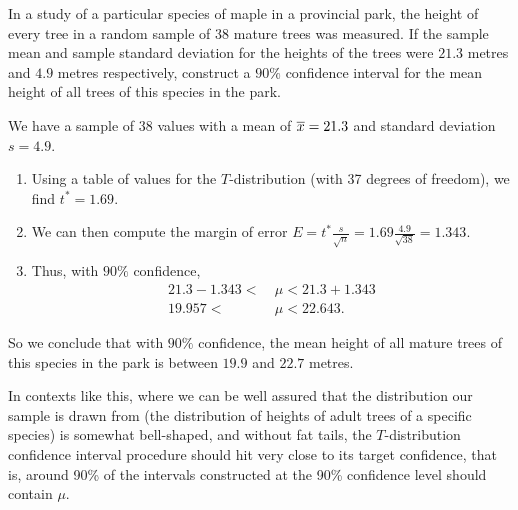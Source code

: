 \begin{example}
In a study of a particular species of maple in a provincial park, the height of every tree in a random sample of 38 mature trees was measured. If the sample mean and sample standard deviation for the heights of the trees were $21.3$ metres and $4.9$ metres respectively, construct a $90\%$ confidence interval for the mean height of all trees of this species in the park.

We have a sample of $38$ values with a mean of ${\overline{x}} = 21.3$ and standard deviation $s = 4.9$.
\begin{center}
\end{center}
\begin{enumerate}[label=\textnormal{\Roman*}.]
\item Using a table of values for the $T$-distribution (with 37 degrees of freedom), we find $t^* = 1.69$.
\item We can then compute the margin of error $E = t^* \frac{s}{\sqrt{n}} = 1.69 \frac{4.9}{\sqrt{38}} = 1.343$.
\item Thus, with $90\%$ confidence,
$$\begin{aligned}21.3-1.343 < \ &\mu < 21.3+1.343 \\ 
19.957 < \ &\mu < 22.643.\end{aligned}$$
\end{enumerate}
So we conclude that with $90\%$ confidence, the mean height of all mature trees of this species in the park is between $19.9$ and $22.7$ metres.
\end{example}

In contexts like this, where we can be well assured that the distribution our sample is drawn from (the distribution of heights of adult trees of a specific species) is somewhat bell-shaped, and without fat tails, the $T$-distribution confidence interval procedure should hit very close to its target confidence, that is, around 90\% of the intervals constructed at the 90\% confidence level should contain $\mu$.


